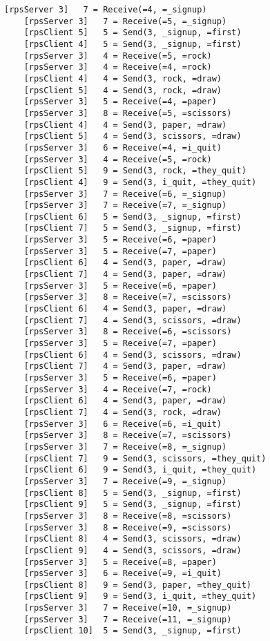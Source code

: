\documentclass{article}
\begin{document}
\begin{Verbatim}[tabsize=4]
    [rpsServer 3]   7 = Receive(=4, =_signup)
    [rpsServer 3]   7 = Receive(=5, =_signup)
    [rpsClient 5]   5 = Send(3, _signup, =first)
    [rpsClient 4]   5 = Send(3, _signup, =first)
    [rpsServer 3]   4 = Receive(=5, =rock)
    [rpsServer 3]   4 = Receive(=4, =rock)
    [rpsClient 4]   4 = Send(3, rock, =draw)
    [rpsClient 5]   4 = Send(3, rock, =draw)
    [rpsServer 3]   5 = Receive(=4, =paper)
    [rpsServer 3]   8 = Receive(=5, =scissors)
    [rpsClient 4]   4 = Send(3, paper, =draw)
    [rpsClient 5]   4 = Send(3, scissors, =draw)
    [rpsServer 3]   6 = Receive(=4, =i_quit)
    [rpsServer 3]   4 = Receive(=5, =rock)
    [rpsClient 5]   9 = Send(3, rock, =they_quit)
    [rpsClient 4]   9 = Send(3, i_quit, =they_quit)
    [rpsServer 3]   7 = Receive(=6, =_signup)
    [rpsServer 3]   7 = Receive(=7, =_signup)
    [rpsClient 6]   5 = Send(3, _signup, =first)
    [rpsClient 7]   5 = Send(3, _signup, =first)
    [rpsServer 3]   5 = Receive(=6, =paper)
    [rpsServer 3]   5 = Receive(=7, =paper)
    [rpsClient 6]   4 = Send(3, paper, =draw)
    [rpsClient 7]   4 = Send(3, paper, =draw)
    [rpsServer 3]   5 = Receive(=6, =paper)
    [rpsServer 3]   8 = Receive(=7, =scissors)
    [rpsClient 6]   4 = Send(3, paper, =draw)
    [rpsClient 7]   4 = Send(3, scissors, =draw)
    [rpsServer 3]   8 = Receive(=6, =scissors)
    [rpsServer 3]   5 = Receive(=7, =paper)
    [rpsClient 6]   4 = Send(3, scissors, =draw)
    [rpsClient 7]   4 = Send(3, paper, =draw)
    [rpsServer 3]   5 = Receive(=6, =paper)
    [rpsServer 3]   4 = Receive(=7, =rock)
    [rpsClient 6]   4 = Send(3, paper, =draw)
    [rpsClient 7]   4 = Send(3, rock, =draw)
    [rpsServer 3]   6 = Receive(=6, =i_quit)
    [rpsServer 3]   8 = Receive(=7, =scissors)
    [rpsServer 3]   7 = Receive(=8, =_signup)
    [rpsClient 7]   9 = Send(3, scissors, =they_quit)
    [rpsClient 6]   9 = Send(3, i_quit, =they_quit)
    [rpsServer 3]   7 = Receive(=9, =_signup)
    [rpsClient 8]   5 = Send(3, _signup, =first)
    [rpsClient 9]   5 = Send(3, _signup, =first)
    [rpsServer 3]   8 = Receive(=8, =scissors)
    [rpsServer 3]   8 = Receive(=9, =scissors)
    [rpsClient 8]   4 = Send(3, scissors, =draw)
    [rpsClient 9]   4 = Send(3, scissors, =draw)
    [rpsServer 3]   5 = Receive(=8, =paper)
    [rpsServer 3]   6 = Receive(=9, =i_quit)
    [rpsClient 8]   9 = Send(3, paper, =they_quit)
    [rpsClient 9]   9 = Send(3, i_quit, =they_quit)
    [rpsServer 3]   7 = Receive(=10, =_signup)
    [rpsServer 3]   7 = Receive(=11, =_signup)
    [rpsClient 10]  5 = Send(3, _signup, =first)

\end{Verbatim}
\end{document}
